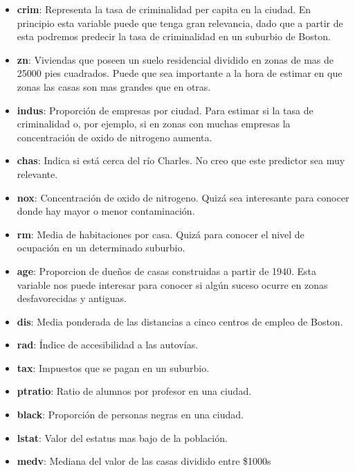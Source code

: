 \begin{itemize}

\item \textbf{crim}: Representa la tasa de criminalidad per capita en la ciudad. En principio esta variable puede que tenga gran relevancia, dado que a partir de esta podremos predecir la tasa de criminalidad en un suburbio de Boston.

\item \textbf{zn}: Viviendas que poseen un suelo residencial dividido en zonas de mas de 25000 pies cuadrados. Puede que sea importante a la hora de estimar en que zonas las casas son mas grandes que en otras.

\item \textbf{indus}: Proporción de empresas por ciudad. Para estimar si la tasa de criminalidad o, por ejemplo, si en zonas con muchas empresas la concentración de oxido de nitrogeno aumenta.

\item \textbf{chas}: Indica si está cerca del río Charles. No creo que este predictor sea muy relevante.

\item \textbf{nox}: Concentración de oxido de nitrogeno. Quizá sea interesante para conocer donde hay mayor o menor contaminación.

\item \textbf{rm}: Media de habitaciones por casa. Quizá para conocer el nivel de ocupación en un determinado suburbio.

\item \textbf{age}: Proporcion de dueños de casas construidas a partir de 1940. Esta variable nos puede interesar para conocer si algún suceso ocurre en zonas desfavorecidas y antiguas.

\item \textbf{dis}: Media ponderada de las distancias a cinco centros de empleo de Boston.

\item \textbf{rad}: Índice de accesibilidad a las autovías.

\item \textbf{tax}: Impuestos que se pagan en un suburbio.

\item \textbf{ptratio}: Ratio de alumnos por profesor en una ciudad.

\item \textbf{black}: Proporción de personas negras en una ciudad.

\item \textbf{lstat}: Valor del estatus mas bajo de la población.

\item \textbf{medv}: Mediana del valor de las casas dividido entre \$1000s

\end{itemize}

